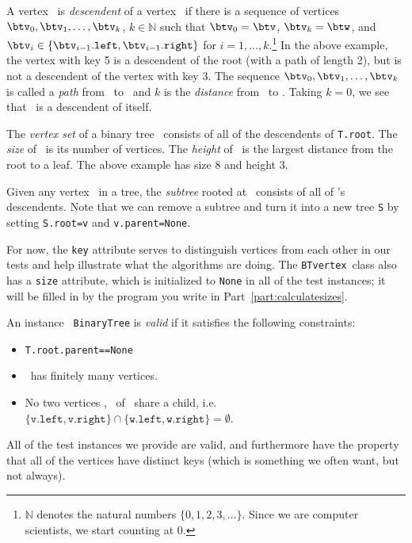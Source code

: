 \documentclass[11pt]{article}
\begin{document}
\begin{enumerate}
 A vertex \btw\ is {\em descendent} of a vertex \btv\ if there is a sequence of vertices $\btv_0,\btv_1,\ldots,\btv_k$, $k\in \mathbb{N}$ such that $\btv_0=\btv$, $\btv_k=\btw$, and 
 $\btv_i \in \{\btv_{i-1}.\texttt{left},\btv_{i-1}.\texttt{right}\}$ for $i=1,\ldots,k$.\footnote{$\mathbb{N}$ denotes the natural numbers $\{0,1,2,3,\ldots\}$.  Since we are computer scientists, we start counting at 0.}
 In the above example, the vertex with key 5 is a descendent of the root (with a path of length 2), but is not a descendent of the vertex with key 3.
 The sequence $\btv_0,\btv_1,\ldots,\btv_k$ is called a {\em path} from \btv\ to \btw\ and $k$ is the {\em distance} from \btv\ to \btw. Taking $k=0$, we see that \btv\ is a descendent of itself.

 The {\em vertex set} of a binary tree \treeT\ consists of all of the descendents of \texttt{T.root}. The {\em size} of \treeT\ is its number of vertices. The {\em height} of \treeT\ is the largest distance from the root to a leaf.  The above example has size 8 and height 3.
 
 Given any vertex \btv\ in a tree, the {\em subtree} rooted at \btv\ consists of all of \btv's descendents.  Note that we can remove a subtree and turn it into a new tree \texttt{S} by setting
 \texttt{S.root=v} and \texttt{v.parent=None}.

 For now, the \texttt{key} attribute serves to distinguish vertices from each other in our tests and help illustrate what the algorithms are doing.  The \texttt{BTvertex}\ class
 also has a \texttt{size} attribute, which is initialized to \texttt{None} in all of the test instances; it will be filled in by the program you write in Part~\ref{part:calculatesizes}.

 An instance \treeT\ \texttt{BinaryTree} is {\em valid} if it satisfies the following constraints: \begin{itemize}
     \item \texttt{T.root.parent==None}
     \item \treeT\ has finitely many vertices.
     \item No two vertices \btv, \btw\ of \treeT\ share a child, i.e. 
     $\{\texttt{v.left},\texttt{v.right}\} \cap \{\texttt{w.left},\texttt{w.right}\} = \emptyset$. 
 \end{itemize}
 All of the test instances we provide are valid, and furthermore have the property that all of the vertices have distinct keys (which is something we often want, but not always).


\end{enumerate}
\end{document}
